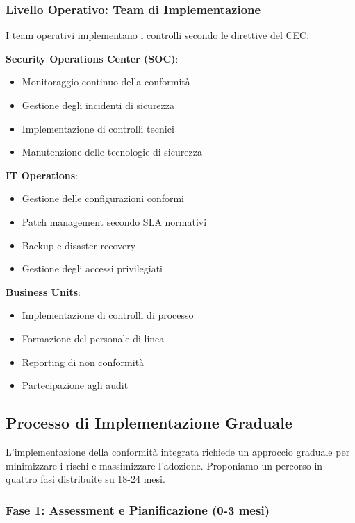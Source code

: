 \subsubsection{Livello Operativo: Team di Implementazione}

I team operativi implementano i controlli secondo le direttive del CEC:

\textbf{Security Operations Center (SOC)}:
\begin{itemize}
    \item Monitoraggio continuo della conformità
    \item Gestione degli incidenti di sicurezza
    \item Implementazione di controlli tecnici
    \item Manutenzione delle tecnologie di sicurezza
\end{itemize}

\textbf{IT Operations}:
\begin{itemize}
    \item Gestione delle configurazioni conformi
    \item Patch management secondo SLA normativi
    \item Backup e disaster recovery
    \item Gestione degli accessi privilegiati
\end{itemize}

\textbf{Business Units}:
\begin{itemize}
    \item Implementazione di controlli di processo
    \item Formazione del personale di linea
    \item Reporting di non conformità
    \item Partecipazione agli audit
\end{itemize}

\subsection{Processo di Implementazione Graduale}
\label{subsec:4.6.2_implementazione}

L'implementazione della conformità integrata richiede un approccio graduale per minimizzare i rischi e massimizzare l'adozione. Proponiamo un percorso in quattro fasi distribuite su 18-24 mesi.

\subsubsection{Fase 1: Assessment e Pianificazione (0-3 mesi)}

